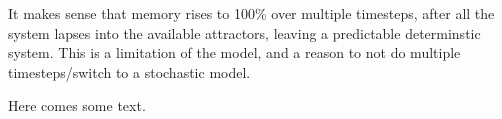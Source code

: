 \documentclass[../main.tex]{subfiles}
\begin{document}
It makes sense that memory  rises to 100\% over multiple timesteps, after all the system lapses into the available attractors, leaving a predictable determinstic system.
This is a limitation of the model, and a reason to not do multiple timesteps/switch to a stochastic model.

Here comes some text.
\end{document}
